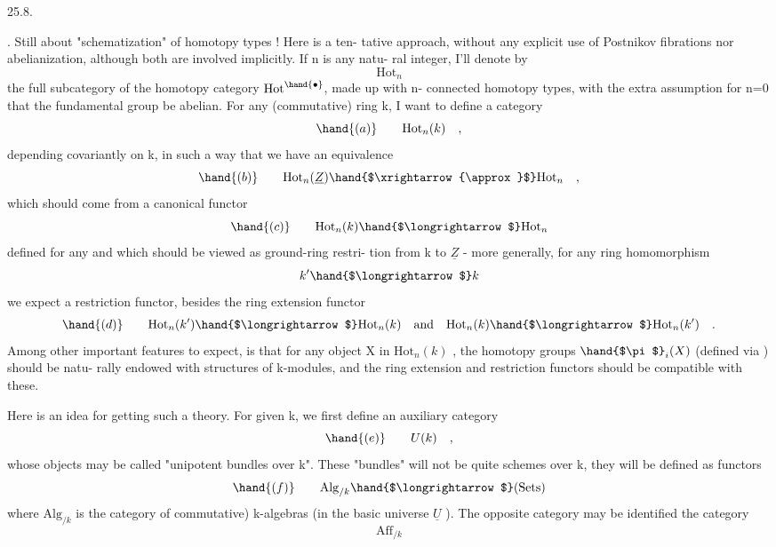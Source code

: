 
25.8.

. Still about "schematization" of homotopy types ! Here is a ten-%
tative approach,  without any explicit use of Postnikov fibrations nor
abelianization,  although both are involved implicitly.  If n is any natu-%
ral integer,  I'll denote by
\[ \mathrm{Hot}_n \]
the full subcategory of the  homotopy category  $\mathrm{Hot}^{\hand{\bullet}}$,  made up with n-%
connected homotopy types,  with the extra assumption for n=0 that the
fundamental group be abelian.  For any (commutative) ring k,  I want to
define a category
\[ \hand{(a)} \qquad \mathrm{Hot}_n(k) \quad , \]
depending covariantly on k,  in such a way that we have an equivalence
\[ \hand{(b)} \qquad \mathrm{Hot}_n(\underline{Z}) \hand{$\xrightarrow{\approx}$} \mathrm{Hot}_n \quad , \]
which should come from a canonical functor
\[ \hand{(c)} \qquad \mathrm{Hot}_n(k) \hand{$\longrightarrow$} \mathrm{Hot}_n \]
defined  for any and which should be viewed as ground-ring restri-%
tion from k to $\underline{Z}$  -  more generally,  for any ring homomorphism
\[ k' \hand{$\longrightarrow$} k \]
we expect a restriction functor,  besides the ring extension functor
\[ \hand{(d)} \qquad \mathrm{Hot}_n(k') \hand{$\longrightarrow$} \mathrm{Hot}_n(k) \quad \text{and} \quad \mathrm{Hot}_n(k) \hand{$\longrightarrow$} \mathrm{Hot}_n(k') \quad . \]
Among other important features to expect,  is that for any object X in
$\mathrm{Hot}_n(k)$ ,  the homotopy groups $\hand{$\pi$}_i(X)$  (defined via ) should be natu-%
rally endowed with structures of k-modules,  and the ring extension and
restriction functors should be compatible with these.

Here is an idea for getting such a theory.  For given k,  we first
define an auxiliary category
\[ \hand{(e)} \qquad U(k) \quad , \]
whose objects may be called "unipotent bundles over k".  
These "bundles" will not be quite schemes over k,  they will be defined
as functors
\[ \hand{(f)} \qquad \mathrm{Alg}_{/k} \hand{$\longrightarrow$} (\mathrm{Sets}) \]
where $\mathrm{Alg}_{/k}$  is the category of \hand{(}commutative) k-algebras (in the basic
universe $\underline{U}$ ).  The opposite category may be identified  the category
\[ \mathrm{Aff}_{/k} \]

